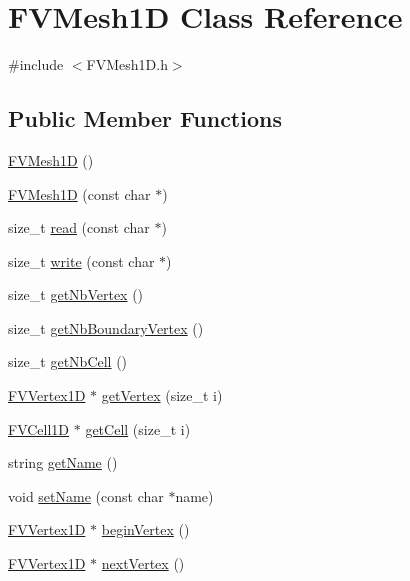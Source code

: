 \hypertarget{classFVMesh1D}{
\section{FVMesh1D Class Reference}
\label{d9/db2/classFVMesh1D}
}


{\ttfamily \#include $<$FVMesh1D.h$>$}

\subsection*{Public Member Functions}
\begin{DoxyCompactItemize}
\item 
\hyperlink{classFVMesh1D_aa41066d30c6a4be1b3f652a8a99fba6e}{FVMesh1D} ()
\item 
\hyperlink{classFVMesh1D_ad33d32b1018a9b7f8e849a2a165f1bfd}{FVMesh1D} (const char $\ast$)
\item 
size\_\-t \hyperlink{classFVMesh1D_a25c8ba5048b8d53613b14c9e0f0e4a34}{read} (const char $\ast$)
\item 
size\_\-t \hyperlink{classFVMesh1D_a4afe5a96e4659fea7ca076ddf1da3620}{write} (const char $\ast$)
\item 
size\_\-t \hyperlink{classFVMesh1D_a8197b8765302aecf9e815d0a29e14a8d}{getNbVertex} ()
\item 
size\_\-t \hyperlink{classFVMesh1D_abc48c18bd3e38734ab97c274629d96a7}{getNbBoundaryVertex} ()
\item 
size\_\-t \hyperlink{classFVMesh1D_a64ae6d6814ef01f53f6fd2f2f9ff8a0c}{getNbCell} ()
\item 
\hyperlink{classFVVertex1D}{FVVertex1D} $\ast$ \hyperlink{classFVMesh1D_ae991d8306b8ed53febb720935c006ed7}{getVertex} (size\_\-t i)
\item 
\hyperlink{classFVCell1D}{FVCell1D} $\ast$ \hyperlink{classFVMesh1D_a313d92268f24a70a97e2a007cdc3ed4f}{getCell} (size\_\-t i)
\item 
string \hyperlink{classFVMesh1D_a11335e13e50af74108bf926dc1340b4b}{getName} ()
\item 
void \hyperlink{classFVMesh1D_ab3a256e7d9fad73fa57de7c1fedf51c5}{setName} (const char $\ast$name)
\item 
\hyperlink{classFVVertex1D}{FVVertex1D} $\ast$ \hyperlink{classFVMesh1D_ad4fad0e0941476b665cf09b20c6f3d93}{beginVertex} ()
\item 
\hyperlink{classFVVertex1D}{FVVertex1D} $\ast$ \hyperlink{classFVMesh1D_ab7a9cc3e82cb21cd210ff298bb9b4794}{nextVertex} ()
\item 

\end{DoxyCompactItemize}
